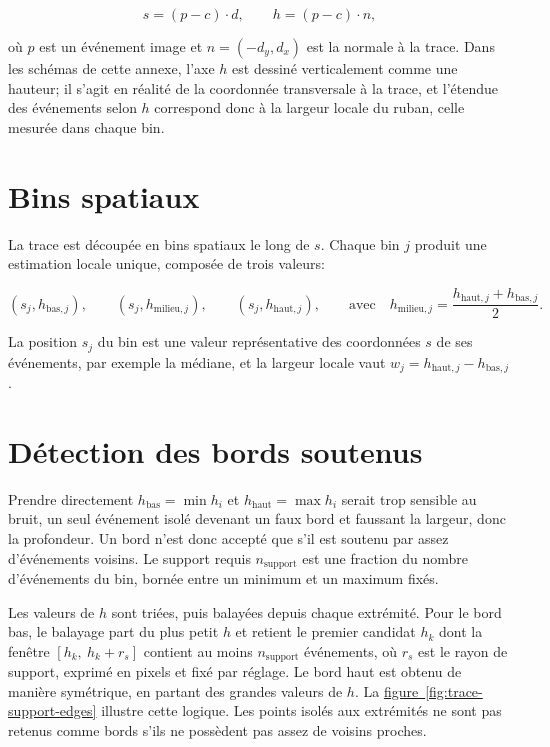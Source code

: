 \documentclass[a4paper,11pt]{report}
\newcommand{\figref}[1]{\hyperref[#1]{figure~\ref*{#1}}}
\begin{document}
\begin{equation}
s = (p - c) \cdot d,
\qquad
h = (p - c) \cdot n,
\label{eq:repere-trace}
\end{equation}

où \(p\) est un événement image et \(n=(-d_y,d_x)\) est la normale à la trace. Dans les schémas de cette annexe, l'axe \(h\) est dessiné verticalement comme une hauteur; il s'agit en réalité de la coordonnée transversale à la trace, et l'étendue des événements selon \(h\) correspond donc à la largeur locale du ruban, celle mesurée dans chaque bin.

\section*{Bins spatiaux}

La trace est découpée en bins spatiaux le long de \(s\). Chaque bin \(j\) produit une estimation locale unique, composée de trois valeurs:

\begin{equation}
(s_j,h_{\text{bas},j}),
\qquad
(s_j,h_{\text{milieu},j}),
\qquad
(s_j,h_{\text{haut},j}),
\qquad \text{avec} \quad
h_{\text{milieu},j}=\frac{h_{\text{haut},j}+h_{\text{bas},j}}{2}.
\label{eq:bin-estimations}
\end{equation}

La position \(s_j\) du bin est une valeur représentative des coordonnées \(s\) de ses événements, par exemple la médiane, et la largeur locale vaut \(w_j = h_{\text{haut},j}-h_{\text{bas},j}\).

\section*{Détection des bords soutenus}

Prendre directement \(h_{\text{bas}}=\min h_i\) et \(h_{\text{haut}}=\max h_i\) serait trop sensible au bruit, un seul événement isolé devenant un faux bord et faussant la largeur, donc la profondeur. Un bord n'est donc accepté que s'il est soutenu par assez d'événements voisins. Le support requis \(n_{\text{support}}\) est une fraction du nombre d'événements du bin, bornée entre un minimum et un maximum fixés.

Les valeurs de \(h\) sont triées, puis balayées depuis chaque extrémité. Pour le bord bas, le balayage part du plus petit \(h\) et retient le premier candidat \(h_k\) dont la fenêtre \([h_k,\ h_k+r_s]\) contient au moins \(n_{\text{support}}\) événements, où \(r_s\) est le rayon de support, exprimé en pixels et fixé par réglage. Le bord haut est obtenu de manière symétrique, en partant des grandes valeurs de \(h\). La \figref{fig:trace-support-edges} illustre cette logique. Les points isolés aux extrémités ne sont pas retenus comme bords s'ils ne possèdent pas assez de voisins proches.
\end{document}

